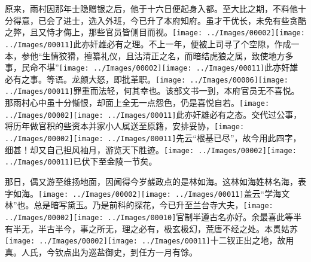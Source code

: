 {原来，雨村因那年士隐赠银之后，他于十六日便起身入都。至大比之期，不料他十分得意，已会了进士，选入外班，今已升了本府知府。虽才干优长，未免有些贪酷之弊，且又恃才侮上，那些官员皆侧目而视。{\texttt{[image: ../Images/00002]}\texttt{[image: ../Images/00011]}\footnotesize \kaishu 此亦奸雄必有之理。}不上一年，便被上司寻了个空隙，作成一本，参他``生情狡猾，擅纂礼仪，且沽清正之名，而暗结虎狼之属，致使地方多事，民命不堪''{\texttt{[image: ../Images/00002]}\texttt{[image: ../Images/00011]}\footnotesize \kaishu 此亦奸雄必有之事。}等语。龙颜大怒，即批革职。{\texttt{[image: ../Images/00006]}\texttt{[image: ../Images/00011]}\footnotesize \kaishu 罪重而法轻，何其幸也。}该部文书一到，本府官员无不喜悦。那雨村心中虽十分惭恨，却面上全无一点怨色，仍是喜悦自若。{\texttt{[image: ../Images/00002]}\texttt{[image: ../Images/00011]}\footnotesize \kaishu 此亦奸雄必有之态。}交代过公事，将历年做官积的些资本并家小人属送至原籍，安排妥协，{\texttt{[image: ../Images/00002]}\texttt{[image: ../Images/00011]}\footnotesize \kaishu 先云``根基已尽''，故今用此四字，细甚！}却又自己担风袖月，游览天下胜迹。{\texttt{[image: ../Images/00002]}\texttt{[image: ../Images/00011]}\footnotesize \kaishu 已伏下至金陵一节矣。}

那日，偶又游至维扬地面，因闻得今岁鹾政点的是林如海。这林如海姓林名海，表字如海。{\texttt{[image: ../Images/00002]}\texttt{[image: ../Images/00011]}\footnotesize \kaishu 盖云``学海文林''也。总是暗写黛玉。}乃是前科的探花，今已升至兰台寺大夫，{\texttt{[image: ../Images/00002]}\texttt{[image: ../Images/00010]}\footnotesize \kaishu 官制半遵古名亦好。余最喜此等半有半无，半古半今，事之所无，理之必有，极玄极幻，荒唐不经之处。}本贯姑苏{\texttt{[image: ../Images/00002]}\texttt{[image: ../Images/00011]}\footnotesize \kaishu 十二钗正出之地，故用真。}人氏，今钦点出为巡盐御史，到任方一月有馀。

}
